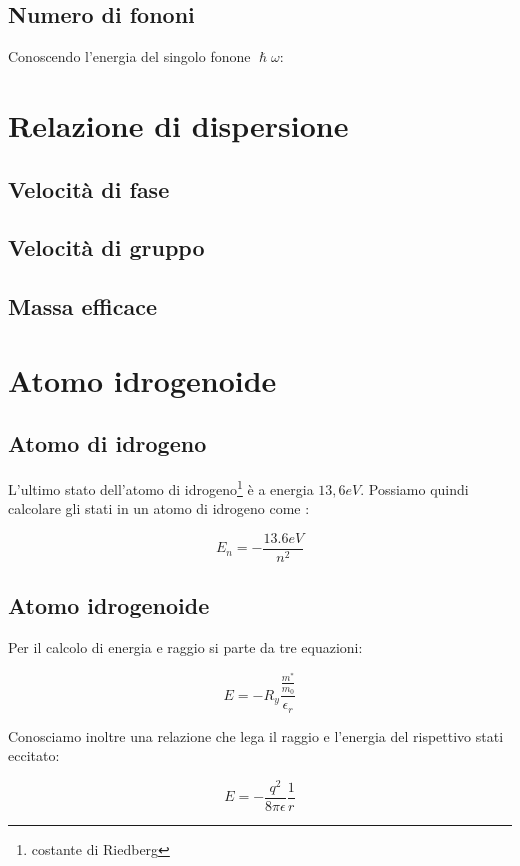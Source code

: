 \documentclass[10pt,a4paper]{report}
\begin{document}
 	\section{Numero di fononi}

 	Conoscendo l'energia del singolo fonone $\hslash \omega$:



\chapter{Relazione di dispersione}

	\section{Velocità di fase}

	\section{Velocità di gruppo}

	\section{Massa efficace}


\chapter{Atomo idrogenoide}
	
	\section{Atomo di idrogeno}

	L'ultimo stato dell'atomo di idrogeno\footnote{costante di Riedberg} è a energia $13,6eV$.
	Possiamo quindi calcolare gli stati in un atomo di idrogeno come :

	\[
	E_n=-\frac{13.6eV}{n^2}
	\] 

	\section{Atomo idrogenoide}
	Per il calcolo di energia e raggio si parte da tre equazioni:

	\[
	E=-R_y\frac{\frac{m^*}{m_0}}{\epsilon_r}
	\]

	Conosciamo inoltre una relazione che lega il raggio e l'energia del rispettivo stati eccitato:

	\[
	E=-\frac{q^2}{8\pi \epsilon}\frac{1}{r}
	\]
\end{document}
